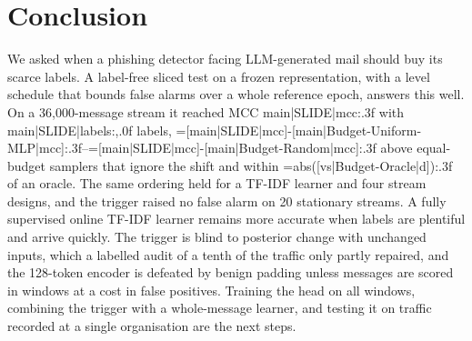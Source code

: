 \section{Conclusion}\label{sec:conclusion}
We asked when a phishing detector facing LLM-generated mail should buy its scarce labels. A label-free sliced test on a frozen representation, with a level schedule that bounds false alarms over a whole reference epoch, answers this well. On a 36{,}000-message stream it reached MCC {{main|SLIDE|mcc:.3f}} with {{main|SLIDE|labels:,.0f}} labels, {{=[main|SLIDE|mcc]-[main|Budget-Uniform-MLP|mcc]:.3f}}--{{=[main|SLIDE|mcc]-[main|Budget-Random|mcc]:.3f}} above equal-budget samplers that ignore the shift and within {{=abs([vs|Budget-Oracle|d]):.3f}} of an oracle. The same ordering held for a TF-IDF learner and four stream designs, and the trigger raised no false alarm on 20 stationary streams. A fully supervised online TF-IDF learner remains more accurate when labels are plentiful and arrive quickly. The trigger is blind to posterior change with unchanged inputs, which a labelled audit of a tenth of the traffic only partly repaired, and the 128-token encoder is defeated by benign padding unless messages are scored in windows at a cost in false positives. Training the head on all windows, combining the trigger with a whole-message learner, and testing it on traffic recorded at a single organisation are the next steps.
